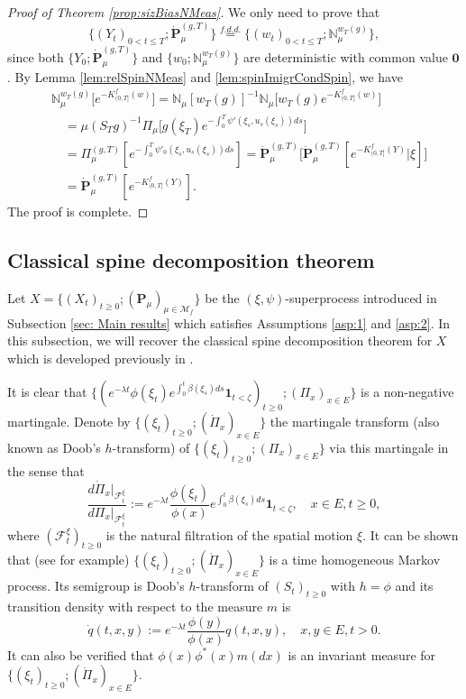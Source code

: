 \documentclass[UTF8]{pkuthss}
\theoremstyle{plain}
\theoremstyle{definition}
\numberwithin{equation}{section}
\begin{document}
\begin{proof}[Proof of Theorem \ref{prop:sizBiasNMeas}]
    We only need to prove that
\[
	\{(Y_t)_{0<t\le T}; \dot{\mathbf P}^{(g,T)}_\mu\}
	\overset{f.d.d.}{=} \{(w_t)_{0<t\le T}; \mathbb N_\mu^{w_T(g)}\},
\]
	since both $\{Y_0; \dot{\mathbf P}^{(g,T)}_\mu\}$ and $\{w_0; \mathbb N_\mu^{w_T(g)}\}$ are deterministic with common value $\mathbf 0$.
	By Lemma \ref{lem:relSpinNMeas} and \ref{lem:spinImigrCondSpin}, we have
\begin{align}
    &\mathbb N_\mu^{w_T(g)}\big[e^{-K_{(0, T]}^f(w)}\big]
	=\mathbb N_\mu[w_T(g)]^{-1} \mathbb N_\mu \big[w_T(g) e^{-K_{(0, T]}^f(w)}\big]\\
	&\quad =\mu(S_Tg)^{-1}  \Pi_\mu\big[g(\xi_T) e^{-\int_0^T \psi'(\xi_s,u_s(\xi_s)) ds}\big]\\
	&\quad =\Pi^{(g,T)}_{\mu}[e^{-\int_0^T \psi'_0(\xi_s, u_s(\xi_s)) ds}]
	=\dot {\mathbf P}^{(g,T)}_\mu\big[ \dot{\mathbf P}^{(g,T)}_\mu[e^{-K_{(0, T]}^f(Y)}|\xi] \big]\\
	&\quad = \dot{\mathbf P}^{(g,T)}_\mu[e^{-K_{(0, T]}^f(Y)}].
\end{align}
	The proof is complete.
\end{proof}

\subsection{Classical spine decomposition theorem}
\label{sec: classcal spine decomposition}
	Let $X=\{(X_t)_{t\geq 0}; (\mathbf P_\mu)_{\mu \in \mathcal M_f}\}$ be the $(\xi,\psi)$-superprocess introduced in Subsection \ref{sec: Main results} which satisfies Assumptions \ref{asp:1} and \ref{asp:2}.
	In this subsection, we will recover the classical spine decomposition theorem for $X$ which is developed previously in \cite{EckhoffKyprianouWinkel2015Spines, EnglanderKyprianou2004Local, LiuRenSong2009Log}.

	It is clear that $\{(e^{-\lambda t}\phi(\xi_t) e^{\int_0^t \beta(\xi_s) ds}\mathbf 1_{t< \zeta})_{t \geq 0}; (\Pi_x)_{x\in E}\}$ is a non-negative martingale.
	Denote by $\{(\xi_t)_{t\geq 0}; (\dot{\Pi}_x)_{x\in E}\}$ the martingale transform (also known as Doob's $h$-transform) of $\{(\xi_t)_{t\geq 0}; (\Pi_x)_{x\in E}\}$ via this martingale in the sense that
\[
	\frac {d \dot{\Pi}_x|_{\mathscr F_t^\xi}} {d \Pi_x|_{\mathscr F_t^\xi}}
	:=e^{-\lambda t} \frac {\phi(\xi_t)} {\phi(x)} e^{\int_0^t \beta(\xi_s) ds} \mathbf 1_{t< \zeta},
	\quad x \in E,t \geq 0,
\]
	where $(\mathscr F^\xi_t)_{t\geq 0}$ is the natural filtration of the spatial motion $\xi$.
   It can be shown that
	(see \cite{KimSong2008Intrinsic} for example) $\{(\xi_t)_{t\geq 0}; (\dot{\Pi}_x)_{x\in E}\}$ is a time homogeneous Markov 
	process.
 Its semigroup is Doob's  $h$-transform of $(S_t)_{t\geq 0}$ with $h=\phi$ and its transition density with respect to the measure $m$ is
\[
	\dot{q}(t,x,y)
	:= e^{-\lambda t}\frac {\phi(y)} {\phi(x)} q(t,x,y),
	\quad x, y\in E, t> 0.
\]
	It can also be verified that $\phi(x)\phi^*(x)m(dx)$ is an invariant measure for $\{(\xi_t)_{t\geq 0}; (\dot{\Pi}_x)_{x\in E}\}$.
\end{document}
